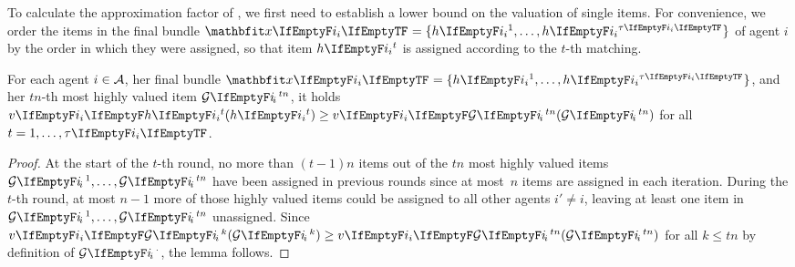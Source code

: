 To calculate the approximation factor of \SMatch, we first need to establish a lower bound on the valuation of single items.
For convenience, we order the items in the final bundle \(\alloc = \{\asgd{1}, \dots, \asgd{\alloclen}\}\) of agent \(i\) by the order in which they were assigned, so that item \(\asgd{t}\) is assigned according to the \(t\)-th matching.
\begin{lemma}
	\label{lem:lower_bound_single_item}
	For each agent \(i \in \mathcal{A}\), her final bundle \(\alloc = \{\asgd{1}, \dots, \asgd{\alloclen}\}\), and her \(tn\)-th most highly valued item \(\goodsordered{tn}\), it holds \(\valuations[\asgd{t}] \geq \valuations[\goodsordered{tn}]\) for all \(t = 1, \dots, \alloclen\).
\end{lemma}
\begin{proof}
	At the start of the \(t\)-th round, no more than \((t-1) n\) items out of the \(tn\) most highly valued items \(\goodsordered{1}, \dots, \goodsordered{tn}\) have been assigned in previous rounds since at most~\(n\) items are assigned in each iteration.
	During the \(t\)-th round, at most \(n-1\) more of those highly valued items could be assigned to all other agents \(i' \neq i\), leaving at least one item in \(\goodsordered{1}, \dots, \goodsordered{tn}\) unassigned.
	Since \(\valuations[\goodsordered{k}] \geq \valuations[\goodsordered{tn}]\) for all \(k \leq tn\) by definition of \(\goodsordered{\cdot}\), the lemma follows.
\end{proof}

